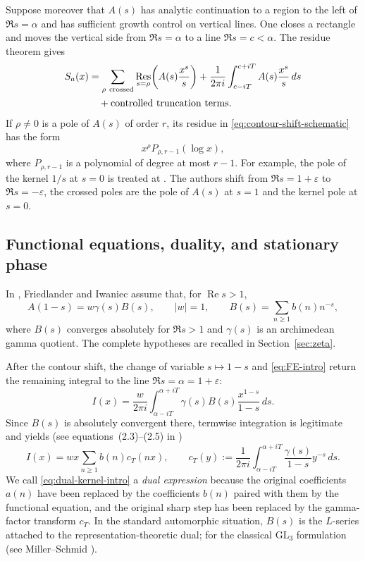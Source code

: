 \documentclass[11pt]{amsart}
\theoremstyle{plain}
\theoremstyle{definition}
\theoremstyle{remark}
\newcommand{\Res}{\operatorname*{Res}}
\numberwithin{equation}{section}
\begin{document}
Suppose moreover that $A(s)$ has analytic continuation to a region to the left of $\Re s=\alpha$ and has sufficient growth control on vertical lines.  One closes a rectangle and moves the vertical side from $\Re s=\alpha$ to a line $\Re s=c<\alpha$.  The residue theorem gives
\begin{align}
  S_a(x)
  &=\sum_{\rho\ \mathrm{crossed}}
   \Res_{s=\rho}\!\left(A(s)\frac{x^s}{s}\right)
   +\frac{1}{2\pi i}\int_{c-iT}^{c+iT}
      A(s)\frac{x^s}{s}\,ds \notag\\
  &\quad+\text{controlled truncation terms}.
  \label{eq:contour-shift-schematic}
\end{align}
If $\rho\ne0$ is a pole of $A(s)$ of order $r$, its residue in \eqref{eq:contour-shift-schematic} has the form
\[
  x^\rho P_{\rho,r-1}(\log x),
\]
where $P_{\rho,r-1}$ is a polynomial of degree at most $r-1$. For example, the pole of the kernel $1/s$ at $s=0$ is treated at \cite[(2.2)--(2.3)]{FriedlanderIwaniec}. The authors shift from $\Re s=1+\varepsilon$ to $\Re s=-\varepsilon$, the crossed poles are the pole of $A(s)$ at $s=1$ and the kernel pole at $s=0$.

\subsection{Functional equations, duality, and stationary phase}

In \cite{FriedlanderIwaniec}, Friedlander and Iwaniec assume that, for $\operatorname{Re}s>1$,
\begin{equation}\label{eq:FE-intro}
  A(1-s)=w\gamma(s)B(s),
  \qquad |w|=1,
  \qquad
  B(s)=\sum_{n\ge1}b(n)n^{-s},
\end{equation}
where $B(s)$ converges absolutely for $\Re s>1$ and $\gamma(s)$ is an archimedean gamma quotient.  The complete hypotheses are recalled in Section~\ref{sec:zeta}.  

After the contour shift, the change of variable $s\mapsto1-s$ and \eqref{eq:FE-intro} return the remaining integral to the line $\Re s=\alpha=1+\varepsilon$:
\begin{equation}\label{eq:dual-integral-intro}
  I(x)
  =\frac{w}{2\pi i}
   \int_{\alpha-iT}^{\alpha+iT}
     \gamma(s)B(s)\frac{x^{1-s}}{1-s}\,ds.
\end{equation}
Since $B(s)$ is absolutely convergent there, termwise integration is legitimate and yields (see equations~(2.3)--(2.5) in \cite[p.~497]{FriedlanderIwaniec})
\begin{equation}\label{eq:dual-kernel-intro}
  I(x)=wx\sum_{n\ge1}b(n)c_T(nx),
  \qquad
  c_T(y):=\frac{1}{2\pi i}
  \int_{\alpha-iT}^{\alpha+iT}
       \frac{\gamma(s)}{1-s}y^{-s}\,ds.
\end{equation}
We call \eqref{eq:dual-kernel-intro} a \emph{dual expression} because the original coefficients $a(n)$ have been replaced by the coefficients $b(n)$ paired with them by the functional equation, and the original sharp step has been replaced by the gamma-factor transform $c_T$.  In the standard automorphic situation, $B(s)$ is the $L$-series attached to the representation-theoretic dual; for the classical $\mathrm{GL}_3$ formulation (see Miller--Schmid \cite[(5.5)]{MillerSchmid}).  
\end{document}
